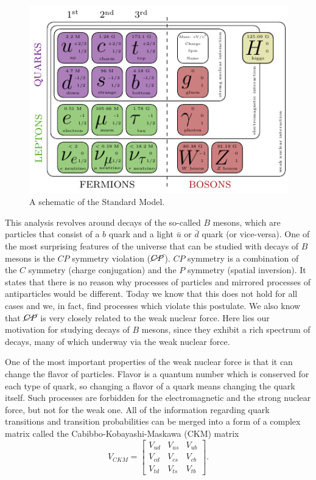 \begin{figure}[H]
\centering
\includegraphics[scale=1.6]{texfig/SM}
\captionsetup{width=.8\linewidth}
\caption{A schematic of the Standard Model.}
\label{fig:sm}
\end{figure}

This analysis revolves around decays of the so-called $B$ mesons, which are particles that consist of a $b$ quark and a light $\bar u$ or $\bar d$ quark (or vice-versa). One of the most surprising features of the universe that can be studied with decays of $B$ mesons is the $CP$ symmetry violation ($\cancel{CP}$). $CP$ symmetry is a combination of the $C$ symmetry (charge conjugation) and the $P$ symmetry (spatial inversion). It states that there is no reason why processes of particles and mirrored processes of antiparticles would be different. Today we know that this does not hold for all cases and we, in fact, find processes which violate this postulate. We also know that $\cancel{CP}$ is very closely related to the weak nuclear force. Here lies our motivation for studying decays of $B$ mesons, since they exhibit a rich spectrum of decays, many of which underway via the weak nuclear force.

One of the most important properties of the weak nuclear force is that it can change the flavor of particles. Flavor is a quantum number which is conserved for each type of quark, so changing a flavor of a quark means changing the quark itself. Such processes are forbidden for the electromagnetic and the strong nuclear force, but not for the weak one. All of the information regarding quark transitions and transition probabilities can be merged into a form of a complex matrix called the Cabibbo-Kobayashi-Maskawa (CKM) matrix \cite{cabibbo1963unitary,kobayashi1973cp}
\begin{equation}
V_{CKM} = \begin{bmatrix}
    V_{ud} & V_{us} & V_{ub}\\
    V_{cd} & V_{cs} & V_{cb}\\
    V_{td} & V_{ts} & V_{tb}
\end{bmatrix}.
\end{equation}

